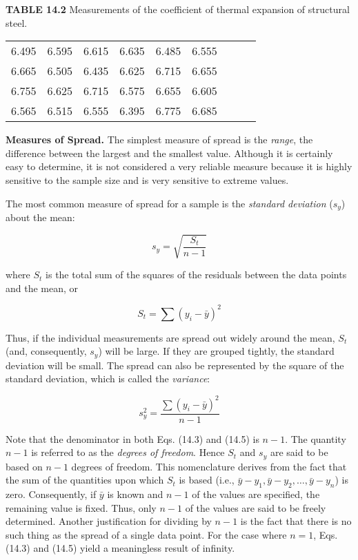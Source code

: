 \documentclass[../main.tex]{subfiles}
\begin{document}
\noindent \textbf{TABLE 14.2}	 \quad Measurements of the coefficient of thermal expansion of structural steel.

\begin{tabular}{ccccccccc}
	6.495 & 6.595 & 6.615 & 6.635 & 6.485 & 6.555 \\
	6.665 & 6.505 & 6.435 & 6.625 & 6.715 & 6.655 \\
	6.755 & 6.625 & 6.715 & 6.575 & 6.655 & 6.605 \\
	6.565 & 6.515 & 6.555 & 6.395 & 6.775 & 6.685
\end{tabular}

\noindent \textbf{Measures of Spread. } \quad  The simplest measure of spread is the \textit{range}, the difference between the largest and the smallest value. Although it is certainly easy to determine, it is not
considered a very reliable measure because it is highly sensitive to the sample size and is
very sensitive to extreme values.

The most common measure of spread for a sample is the \textit{standard deviation} ($s_ y$) about
the mean:

\begin{equation}
	\tag{14.3}
	s_y = \sqrt{\frac{S_t}{n-1}}
\end{equation}

\noindent where $S_t$ is the total sum of the squares of the residuals between the data points and the
mean, or

\begin{equation}
	\tag{14.4}
	S_t = \sum (y_i - \bar{y})^2
\end{equation}

\noindent Thus, if the individual measurements are spread out widely around the mean, $S_t$ (and, consequently, $s_y$) will be large. If they are grouped tightly, the standard deviation will be small.
The spread can also be represented by the square of the standard deviation, which is called
the \textit{variance}:

\begin{equation}
	\tag{14.5}
	s^2_y = \frac{\sum (y_i - \bar{y})^2}{n-1}
\end{equation}

Note that the denominator in both Eqs. (14.3) and (14.5) is $n - 1$. The quantity $n - 1$
is referred to as the \textit{degrees of freedom}. Hence $S_t$ and $s_y$ are said to be based on $n - 1$ degrees of freedom. This nomenclature derives from the fact that the sum of the quantities
upon which $S_t$ is based (i.e., $\bar{y} - y_1 , \bar{y} - y_2 , \dots , \bar{y} - y_n$) is zero. Consequently, if $\bar{y}$ is
known and $n - 1$ of the values are specified, the remaining value is fixed. Thus, only $n - 1$
of the values are said to be freely determined. Another justification for dividing by $n - 1$ is
the fact that there is no such thing as the spread of a single data point. For the case where
$n = 1$, Eqs. (14.3) and (14.5) yield a meaningless result of infinity.
\end{document}
